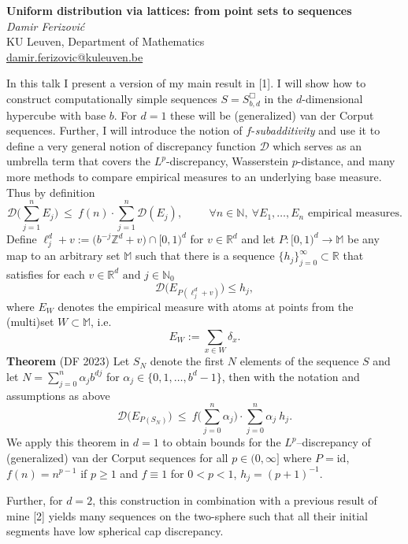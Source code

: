 \documentclass[12pt,a4paper,figuresright]{book}
\newenvironment{talk}[6]%
{%
	\vskip 0pt\nopagebreak%
	\vskip 0pt\nopagebreak%
	\textbf{#1}\vspace{3mm}\\\nopagebreak%
	\textit{#2}\\\nopagebreak%
	#3\\\nopagebreak%
	\url{#4}\vspace{3mm}\\\nopagebreak%
	\ifthenelse{\equal{#5}{}}{}{Coauthor(s): #5\vspace{3mm}\\\nopagebreak}%
	\ifthenelse{\equal{#6}{}}{}{Special session: #6\quad \vspace{3mm}\\\nopagebreak}%
}
{\vspace{1cm}\\\nopagebreak}%
\begin{document}
	
	
	
	\begin{talk}
		{Uniform distribution via lattices: from point sets to sequences}%
		{Damir Ferizovi\'{c}}%
		{KU Leuven, Department of Mathematics}%
		{damir.ferizovic@kuleuven.be}%
		{}%
		{}%
		
		
		In this talk I present a version of my main result in [1]. I will show how to construct computationally simple sequences $S=S^\Box_{b,d}$ in the $d$-dimensional hypercube with base $b$. For $d=1$ these will be (generalized) van der Corput sequences. Further, I will introduce the notion of $f$-\textit{subadditivity}  and use it to define a very general notion of discrepancy function $\mathcal{D}$ which serves as an umbrella term that covers the $L^p$-discrepancy, Wasserstein $p$-distance,  and many more methods to compare empirical measures to an underlying base measure. Thus by definition
		\[
		\mathcal{D}\Big(\sum_{j=1}^{n}E_j\Big)\ \leq\ f(n)\cdot \sum_{j=1}^{n} \mathcal{D}(E_j), \hspace{1cm}\forall n\in\mathbb{N},\ \forall E_1,\ldots,E_n\mbox{ empirical measures}.
		\] 		
		Define $\ell^d_j+v:=\big(b^{-j} \mathbb{Z}^d+v\big)\cap[0,1)^d$ for $v\in\mathbb{R}^d$ and let $P:[0,1)^d\rightarrow \mathbb{M}$ be any map to an arbitrary set $\mathbb{M}$ such that there is a sequence $\{h_j\}_{j=0}^{\infty}\subset \mathbb{R}$ that satisfies  for each $v\in\mathbb{R}^d\mbox{ and }j\in\mathbb{N}_0$
		\[
			\mathcal{D}\big(E_{P(\ell^d_j+v)}\big)\leq h_j, 
		\]
		where  $E_W$ denotes the empirical measure with atoms at points from the (multi)set $W\subset \mathbb{M}$, i.e. 
		\[
			E_W:=\sum_{x\in W} \delta_x.
		\]
		\textbf{Theorem} (DF 2023) Let $S_N$ denote the first $N$ elements of the sequence $S$ and let  $N=\sum_{j=0}^{n}\alpha_j b^{dj}$ for $\alpha_j\in\{0,1,\ldots,b^d-1\}$, then with the notation and assumptions as above
		\[
			\mathcal{D}\big(E_{P(S_N)}\big)\ \leq\ f\Big(\sum_{j=0}^n\alpha_j\Big)\cdot \sum_{j=0}^{n}\alpha_j \ h_j.
		\]
		We apply this theorem in $d=1$ to obtain bounds for the $L^p$--discrepancy of (generalized) van der Corput sequences  for all $p\in(0,\infty]$ where $P=\mathrm{id}$, $f(n)=n^{p-1}$ if $p\geq 1$ and $f\equiv 1$ for $0<p<1$, $h_j=(p+1)^{-1}$. 
		
		Further, for $d=2$, this construction in combination with a previous result of mine [2] yields  many sequences on the two-sphere such that all their initial segments have low  spherical cap discrepancy.
		

\end{talk}
\end{document}

